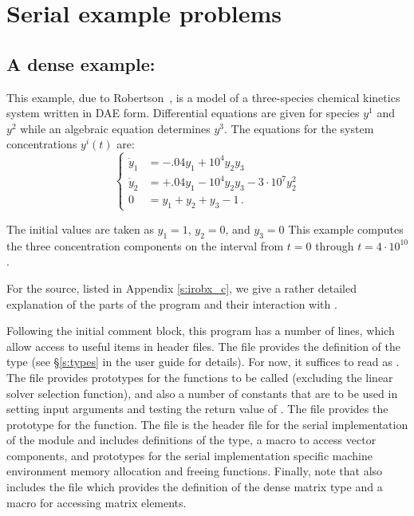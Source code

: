 \section{Serial example problems}\label{s:ex_serial}

\subsection{A dense example: }\label{ss:irobx}

This example, due to Robertson~\cite{Rob:66}, is a model of a three-species 
chemical kinetics system written in DAE form. Differential equations are given 
for species $y^1$ and $y^2$ while an algebraic equation determines $y^3$. The 
equations for the system concentrations $y^i(t)$ are:
\begin{equation}\label{e:irobx_ODE}
\begin{cases}
  \dot y_1 &= -.04 y_1 + 10^4 y_2 y_3   \\
  \dot y_2 &= +.04 y_1 - 10^4 y_2 y_3 - 3 \cdot 10^7 y_2^2  \\
  0 &=  y_1 + y_2 + y_3 - 1 \, .
\end{cases}
\end{equation}

The initial values are taken as $y_1 = 1$, $y_2 = 0$, and $y_3 = 0$
This example computes the three concentration components on the interval
from $t=0$ through $t=4 \cdot 10^{10}$.

For the source, listed in Appendix \ref{s:irobx_c}, we give a rather detailed
explanation of the parts of the program and their interaction with {\ida}.

Following the initial comment block, this program has a number
of  lines, which allow access to useful items in {\ida}
header files.  The  file provides the definition of the
type  (see \S\ref{s:types} in the user guide \cite{ida2.2.0_ug}
for details).  For now, it suffices to read  as .
The  file provides prototypes for the {\ida}
functions to be called (excluding the linear solver selection
function), and also a number of constants that are to be used in
setting input arguments and testing the return value of .
The  file provides the prototype for the  function.
The  file is the header file for the serial
implementation of the {\nvector} module and includes definitions of the 
 type, a macro to access vector components, and prototypes 
for the serial implementation specific machine environment memory allocation
and freeing functions.
Finally, note that  also includes the  file which 
provides the definition of the dense matrix type  and a macro for 
accessing matrix elements.

